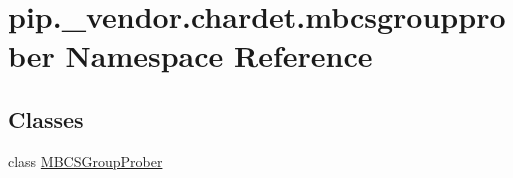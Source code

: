 \hypertarget{namespacepip_1_1__vendor_1_1chardet_1_1mbcsgroupprober}{}\section{pip.\+\_\+vendor.\+chardet.\+mbcsgroupprober Namespace Reference}
\label{namespacepip_1_1__vendor_1_1chardet_1_1mbcsgroupprober}
\subsection*{Classes}
\begin{DoxyCompactItemize}
\item 
class \hyperlink{classpip_1_1__vendor_1_1chardet_1_1mbcsgroupprober_1_1MBCSGroupProber}{M\+B\+C\+S\+Group\+Prober}
\end{DoxyCompactItemize}
